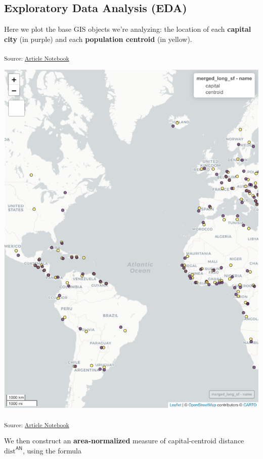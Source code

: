 \documentclass[
  letterpaper,
  DIV=11,
  numbers=noendperiod]{scrartcl}
\begin{document}
\subsection{Exploratory Data Analysis
(EDA)}\label{exploratory-data-analysis-eda}

Here we plot the base GIS objects we're analyzing: the location of each
\textbf{capital city} (in purple) and each \textbf{population centroid}
(in yellow).

\textsubscript{Source:
\href{https://jpowerj.github.io/gis-manuscript-template/index.qmd.html}{Article
Notebook}}

\includegraphics{index_files/figure-pdf/load-eda-1.pdf}

\textsubscript{Source:
\href{https://jpowerj.github.io/gis-manuscript-template/index.qmd.html}{Article
Notebook}}

We then construct an \textbf{area-normalized} measure of
capital-centroid distance \(\text{dist}^{\textsf{AN}}\), using the
formula
\end{document}
